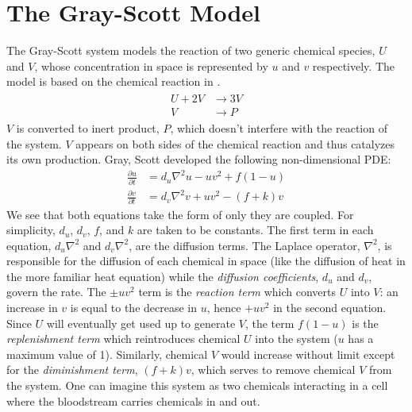 \section{The Gray-Scott Model}
	The Gray-Scott system models the reaction of two generic chemical species, $U$ and $V$, whose concentration in space is represented by $u$ and $v$ respectively. The model is based on the chemical reaction in .
	\begin{align}
	\begin{split}
		U + 2V &\rightarrow 3V \\
		V &\rightarrow P
		\label{eq:gs-chem}
	\end{split}
	\end{align}
$V$ is converted to inert product, $P$, which doesn't interfere with the reaction of the system. $V$ appears on both sides of the chemical reaction and thus catalyzes its own production. Gray, Scott developed the following non-dimensional PDE:
	\begin{align}\label{eq:gs}
		\frac{\partial u}{\partial t} & = d_u \nabla^2 u - uv^2 + f(1-u) \\
		\frac{\partial v}{\partial t} & = d_v \nabla^2 v  + uv^2 - (f +k)v
	\end{align}
We see that both equations take the form of  only they are coupled. For simplicity, $d_u$, $d_v$, $f$, and $k$ are taken to be constants. The first term in each equation, $d_u \nabla^2$ and $d_v \nabla^2$, are the diffusion terms. The Laplace operator, $\nabla^2$, is responsible for the diffusion of each chemical in space (like the diffusion of heat in the more familiar heat equation) while the \textit{diffusion coefficients}, $d_u$ and $d_v$, govern the rate. The $\pm uv^2$ term is the  \textit{reaction term} which converts $U$ into $V$: an increase in $v$ is equal to the decrease in $u$, hence $+uv^2$ in the second equation. Since $U$ will eventually get used up to generate $V$, the term $f(1-u)$ is the \textit{replenishment term} which reintroduces chemical $U$ into the system ($u$ has a maximum value of 1). Similarly, chemical $V$ would increase without limit except for the \textit{diminishment term}, $(f+k)v$, which serves to remove chemical $V$ from the system. One can imagine this system as two chemicals interacting in a cell where the bloodstream carries chemicals in and out.

